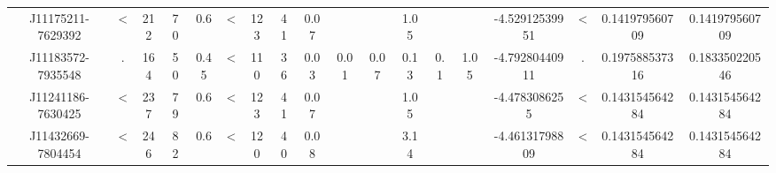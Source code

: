 \begin{table}
\begin{tabular}{cccccccccccccccccc}
J11175211-7629392 & < & 212 & 70 & 0.6 & < & 123 & 41 & 0.07 &  &  & 1.05 &  &  & -4.52912539951 & < & 0.141979560709 & 0.141979560709 \\
J11183572-7935548 & . & 164 & 50 & 0.45 & < & 110 & 36 & 0.03 & 0.01 & 0.07 & 0.13 & 0.1 & 1.05 & -4.79280440911 & . & 0.197588537316 & 0.183350220546 \\
J11241186-7630425 & < & 237 & 79 & 0.6 & < & 123 & 41 & 0.07 &  &  & 1.05 &  &  & -4.4783086255 & < & 0.143154564284 & 0.143154564284 \\
J11432669-7804454 & < & 246 & 82 & 0.6 & < & 120 & 40 & 0.08 &  &  & 3.14 &  &  & -4.46131798809 & < & 0.143154564284 & 0.143154564284 \\
\end{tabular}
\end{table}
